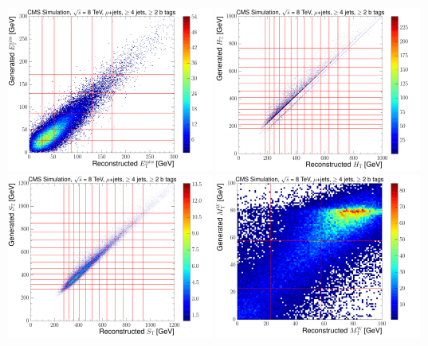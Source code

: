  \begin{figure}[H]
    \centering
     \includegraphics[width=0.48\textwidth]{Chapters/07_08_09_Analysis/Images/binning/muon_MET_8TeV.pdf}\hfill
     \includegraphics[width=0.48\textwidth]{Chapters/07_08_09_Analysis/Images/binning/muon_HT_8TeV.pdf}\\
     \includegraphics[width=0.48\textwidth]{Chapters/07_08_09_Analysis/Images/binning/muon_ST_8TeV.pdf}\hfill
     \includegraphics[width=0.48\textwidth]{Chapters/07_08_09_Analysis/Images/binning/muon_MT_8TeV.pdf}\\

\end{figure}

